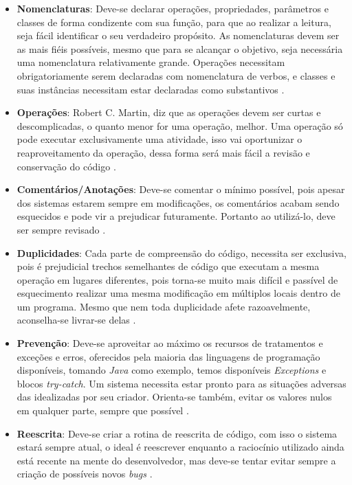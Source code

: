\begin{itemize}
\item{\textbf{Nomenclaturas}}:
Deve-se declarar operações, propriedades, parâmetros e classes de forma condizente com sua função, para que  ao realizar a leitura, seja fácil identificar o seu verdadeiro propósito. As nomenclaturas devem ser as mais fiéis possíveis, mesmo que para se alcançar o objetivo, seja necessária uma nomenclatura relativamente grande. Operações necessitam obrigatoriamente serem declaradas com nomenclatura de verbos, e classes e suas instâncias necessitam estar declaradas como substantivos \cite{ZanetteBeCodeCleanCode2017}.

\item{\textbf{Operações}}:
Robert C. Martin, diz que as operações devem ser curtas e descomplicadas, o quanto menor for uma operação, melhor. Uma operação só pode executar exclusivamente uma atividade, isso vai oportunizar o reaproveitamento da operação, dessa forma será mais fácil a revisão e conservação do código \cite{ZanetteBeCodeCleanCode2017}.

\item{\textbf{Comentários/Anotações}}:
Deve-se comentar o mínimo possível, pois apesar dos sistemas estarem sempre em modificações, os comentários acabam sendo esquecidos e pode vir a prejudicar futuramente. Portanto ao utilizá-lo, deve ser sempre revisado \cite{ZanetteBeCodeCleanCode2017}.

\item{\textbf{Duplicidades}}:
Cada parte de compreensão do código, necessita ser exclusiva, pois é prejudicial trechos semelhantes de código que executam a mesma operação em lugares diferentes, pois torna-se muito mais difícil e passível de esquecimento realizar uma mesma modificação em múltiplos locais dentro de um programa. Mesmo que nem toda duplicidade afete razoavelmente, aconselha-se livrar-se delas \cite{ZanetteBeCodeCleanCode2017}.

\item{\textbf{Prevenção}}:
Deve-se aproveitar ao máximo os recursos de tratamentos e exceções e erros, oferecidos pela maioria das linguagens de programação disponíveis, tomando \textit{Java} como exemplo, temos disponíveis \textit{Exceptions} e blocos \textit{try-catch}. Um sistema necessita estar pronto para as situações adversas das idealizadas por seu criador. Orienta-se também, evitar os valores nulos em qualquer parte, sempre que possível \cite{ZanetteBeCodeCleanCode2017}.

\item{\textbf{Reescrita}}:
Deve-se criar a rotina de reescrita de código, com isso o sistema estará sempre atual, o ideal é reescrever enquanto a raciocínio utilizado ainda está recente na mente do desenvolvedor, mas deve-se tentar evitar sempre a criação de possíveis novos \textit{bugs} \cite{ZanetteBeCodeCleanCode2017}. 


\end{itemize}
